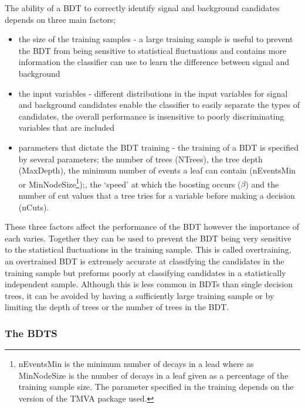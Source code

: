The ability of a BDT to correctly identify signal and background candidates depends on three main factors;
\begin{itemize}
\item the size of the training samples - a large training sample is useful to prevent the BDT from being sensitive to statistical fluctuations and contains more information the classifier can use to learn the difference between signal and background
\item the input variables - different distributions in the input variables for signal and background candidates enable the classifier to easily separate the types of candidates, the overall performance is insensitive to poorly discriminating variables that are included
\item parameters that dictate the BDT training - the training of a BDT is specified by several parameters; the number of trees (NTrees), the tree depth (MaxDepth), the minimum number of events a leaf can contain (nEventsMin or MinNodeSize\footnote{nEventsMin is the minimum number of decays in a lead where as MinNodeSize is the number of decays in a leaf given as a percentage of the training sample size. The parameter specified in the training depends on the version of the TMVA package used. });, the `speed’ at which the boosting occurs ($\beta$) and the number of cut values that a tree tries for a variable before making a decision (nCuts).
\end{itemize}

These three factors affect the performance of the BDT however the importance of each varies. Together they can be used to prevent the BDT being very sensitive to the statistical fluctuations in the training sample. This is called overtraining, an overtrained BDT is extremely accurate at classifying the candidates in the training sample but preforms poorly at classifying candidates in a statistically independent sample. Although this is less common in BDTs than single decision trees, it can be avoided by having a sufficiently large training sample or by limiting the depth of trees or the number of trees in the BDT. 

\subsubsection{The BDTS}
\label{BDTS}

